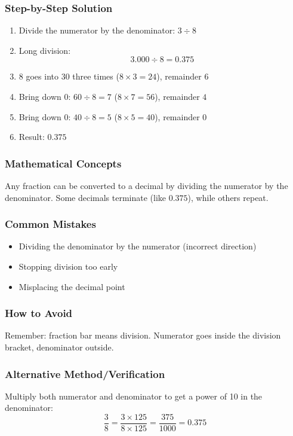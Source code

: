 \documentclass[12pt,a4paper]{article}
\begin{document}
\subsubsection*{Step-by-Step Solution}
\begin{enumerate}
    \item Divide the numerator by the denominator: $3 \div 8$
    \item Long division:
    \[3.000 \div 8 = 0.375\]
    \item $8$ goes into $30$ three times ($8 \times 3 = 24$), remainder $6$
    \item Bring down $0$: $60 \div 8 = 7$ ($8 \times 7 = 56$), remainder $4$
    \item Bring down $0$: $40 \div 8 = 5$ ($8 \times 5 = 40$), remainder $0$
    \item Result: $0.375$
\end{enumerate}

\subsubsection*{Mathematical Concepts}
Any fraction can be converted to a decimal by dividing the numerator by the denominator. Some decimals terminate (like $0.375$), while others repeat.

\subsubsection*{Common Mistakes}
\begin{itemize}
    \item Dividing the denominator by the numerator (incorrect direction)
    \item Stopping division too early
    \item Misplacing the decimal point
\end{itemize}

\subsubsection*{How to Avoid}
Remember: fraction bar means division. Numerator goes inside the division bracket, denominator outside.

\subsubsection*{Alternative Method/Verification}
Multiply both numerator and denominator to get a power of 10 in the denominator:
\[\frac{3}{8} = \frac{3 \times 125}{8 \times 125} = \frac{375}{1000} = 0.375\]
\end{document}
